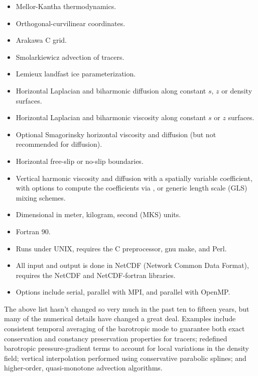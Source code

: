 \begin{klist}
\begin{itemize}
  \item Mellor-Kantha thermodynamics.
  \item Orthogonal-curvilinear coordinates.
  \item Arakawa C grid.
  \item Smolarkiewicz advection of tracers.
  \item Lemieux landfast ice parameterization.
\end{itemize}
 \mbox{}
\begin{itemize}
  \item Horizontal Laplacian and biharmonic
    diffusion along constant $s$, $z$ or density
    surfaces.
  \item Horizontal Laplacian and biharmonic viscosity
    along constant $s$ or $z$ surfaces.
  \item Optional Smagorinsky horizontal viscosity and diffusion (but
  not recommended for diffusion).
  \item Horizontal free-slip or no-slip boundaries.
  \item Vertical harmonic viscosity and diffusion with a spatially
    variable coefficient, with options to compute the coefficients
    via \citet{Large94, Mellor74},
    or generic length scale (GLS) \citet{Umlauf2003} mixing schemes.
\end{itemize}
\newpage
{} \mbox{}
\begin{itemize}
  \item Dimensional in meter, kilogram, second (MKS) units.
  \item Fortran 90.
  \item Runs under UNIX, requires the C preprocessor, gnu make, and
  Perl.
  \item All input and output is done in NetCDF \cite{netCDF} (Network
    Common Data Format), requires the NetCDF and NetCDF-fortran
    libraries.
  \item Options include serial, parallel with MPI, and parallel with
  OpenMP.
\end{itemize}
\end{klist}
The above list hasn't changed so very much in the past ten to fifteen
years, but many of the numerical details have changed a great deal.
Examples include consistent temporal averaging of the barotropic
mode to guarantee both exact conservation and constancy preservation
properties for tracers; redefined barotropic pressure-gradient terms
to account for local variations in the density field; vertical
interpolation performed using conservative parabolic splines; and
higher-order, quasi-monotone advection algorithms.

